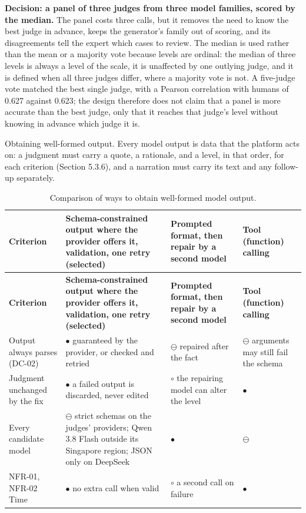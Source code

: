 \textbf{Decision: a panel of three judges from three model families, scored by the median.} The panel costs three calls, but it removes the need to know the best judge in advance, keeps the generator's family out of scoring, and its disagreements tell the expert which cases to review. The median is used rather than the mean or a majority vote because levels are ordinal: the median of three levels is always a level of the scale, it is unaffected by one outlying judge, and it is defined when all three judges differ, where a majority vote is not. A five-judge vote matched the best single judge, with a Pearson correlation with humans of 0.627 against 0.623\cite{r123}; the design therefore does not claim that a panel is more accurate than the best judge, only that it reaches that judge's level without knowing in advance which judge it is.

Obtaining well-formed output. Every model output is data that the platform acts on: a judgment must carry a quote, a rationale, and a level, in that order, for each criterion (Section 5.3.6), and a narration must carry its text and any follow-up separately.

{\small
\begin{longtable}{|>{\raggedright\arraybackslash}p{}|>{\raggedright\arraybackslash}p{}|>{\raggedright\arraybackslash}p{}|>{\raggedright\arraybackslash}p{}|}
\caption{Comparison of ways to obtain well-formed model output.} \\
\hline
\textbf{Criterion} & \textbf{Schema-constrained output where the provider offers it, validation, one retry (selected)} & \textbf{Prompted format, then repair by a second model} & \textbf{Tool (function) calling} \\ \hline
\endfirsthead
\hline
\textbf{Criterion} & \textbf{Schema-constrained output where the provider offers it, validation, one retry (selected)} & \textbf{Prompted format, then repair by a second model} & \textbf{Tool (function) calling} \\ \hline
\endhead
Output always parses (DC-02) & $\bullet$ guaranteed by the provider, or checked and retried & $\ominus$ repaired after the fact & $\ominus$ arguments may still fail the schema \\ \hline
Judgment unchanged by the fix & $\bullet$ a failed output is discarded, never edited & $\circ$ the repairing model can alter the level & $\bullet$ \\ \hline
Every candidate model & $\ominus$ strict schemas on the judges' providers; Qwen 3.8 Flash outside its Singapore region\cite{r200}; JSON only on DeepSeek\cite{r201} & $\bullet$ & $\ominus$ \\ \hline
NFR-01, NFR-02 Time & $\bullet$ no extra call when valid & $\circ$ a second call on failure & $\bullet$ \\ \hline
\end{longtable}
}

